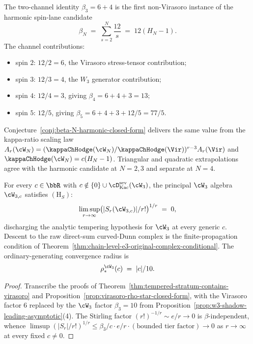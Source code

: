 \begin{remark}
\label{rem:beta-N-first-principles-derivation-path}
The two-channel identity $\beta_3=6+4$ is the first non-Virasoro
instance of the harmonic spin-lane candidate
\[
 \beta_N
 \;=\;
 \sum_{s=2}^{N}\frac{12}{s}
 \;=\;
 12(H_N-1).
\]
The channel contributions:
\begin{itemize}[nosep]
\item spin $2$: $12/2=6$, the Virasoro stress-tensor contribution;
\item spin $3$: $12/3=4$, the $W_3$ generator contribution;
\item spin $4$: $12/4=3$, giving $\beta_4=6+4+3=13$;
\item spin $5$: $12/5$, giving $\beta_5=6+4+3+12/5=77/5$.
\end{itemize}
Conjecture~\ref{conj:beta-N-harmonic-closed-form} delivers the
same value from the kappa-ratio scaling law
$A_r(\cW_N)=(\kappaChHodge(\cW_N)/\kappaChHodge(\Vir))^{r-3}A_r(\Vir)$ and
$\kappaChHodge(\cW_N)=c(H_N-1)$. Triangular and quadratic
extrapolations agree with the harmonic candidate at $N=2,3$ and
separate at $N=4$.
\end{remark}

\begin{theorem}
\label{thm:tempered-stratum-contains-w3}
For every $c \in \bbR$ with
$c \notin \{0\} \cup \cD^{\mathrm{sev}}_{\mathrm{Kac}}(\cW_3)$, the
principal $\cW_3$ algebra $\cW_{3, c}$ satisfies $(\mathrm{H}_S)$:
\[
 \limsup_{r \to \infty}
 \bigl( \lvert S_r(\cW_{3, c}) \rvert / r! \bigr)^{1/r}
 \;=\;
 0,
\]
discharging the analytic tempering hypothesis for $\cW_3$ at every
generic $c$. Descent to the raw direct-sum curved-Dunn complex is the
finite-propagation condition of
Theorem~\ref{thm:chain-level-e3-original-complex-conditional}. The
ordinary-generating convergence radius is
\[
 \rho_*^{\cW_3}(c) \;=\; \lvert c \rvert / 10.
\]
\end{theorem}

\begin{proof}
Transcribe the proofs of
Theorem~\ref{thm:tempered-stratum-contains-virasoro} and
Proposition~\ref{prop:virasoro-rho-star-closed-form}, with the
Virasoro factor $6$ replaced by the $\cW_3$ factor $\beta_3 = 10$
from Proposition~\ref{prop:w3-shadow-leading-asymptotic}(4). The
Stirling factor $(r!)^{-1/r} \sim e/r \to 0$ is $\beta$-independent,
whence
$\limsup (|S_r| / r!)^{1/r} \le \beta_3 / c \cdot e/r \cdot (\text{bounded
tier factor}) \to 0$ as $r \to \infty$ at every fixed $c \neq 0$.
\end{proof}

